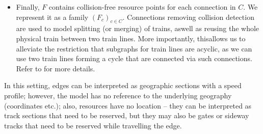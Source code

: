 \documentclass{article}
\begin{document}
\begin{itemize}
    \item Finally, $F$ contains collision-free resource points for each connection in $C$. We represent it as a family $(F_c)_{c\in C}$. Connections removing collision detection are used to model splitting (or merging) of trains, aswell as reusing the whole physical train between two train lines. More importantly, thisallows us to alleviate the restriction that subgraphs for train lines are acyclic, as we can use two train lines forming a cycle that are connected via such connections. Refer to \cite{DBLP:journals/corr/abs-2003-08598} for more details.
\end{itemize}
In this setting, edges can be interpreted as geographic sections with a speed profile; however, the model has no reference to the underlying geography (coordinates etc.); also, resources have no location -- they can be interpreted as track sections that need to be reserved, but they may also be gates or sideway tracks that need to be reserved while travelling the edge.
\end{document}
